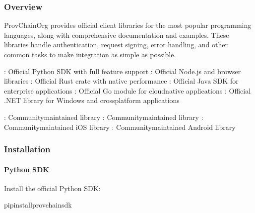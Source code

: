 \documentclass[letterpaper,10pt,english]{sphinxmanual}
\begin{document}
\subsubsection{Overview}
\label{\detokenize{api/client-libraries:overview}}
\sphinxAtStartPar
ProvChainOrg provides official client libraries for the most popular programming languages, along with comprehensive documentation and examples. These libraries handle authentication, request signing, error handling, and other common tasks to make integration as simple as possible.

\sphinxAtStartPar
{}
\sphinxhyphen{} : Official Python SDK with full feature support
\sphinxhyphen{} : Official Node.js and browser libraries
\sphinxhyphen{} : Official Rust crate with native performance
\sphinxhyphen{} : Official Java SDK for enterprise applications
\sphinxhyphen{} : Official Go module for cloud\sphinxhyphen{}native applications
\sphinxhyphen{} : Official .NET library for Windows and cross\sphinxhyphen{}platform applications

\sphinxAtStartPar
{}
\sphinxhyphen{} : Community\sphinxhyphen{}maintained library
\sphinxhyphen{} : Community\sphinxhyphen{}maintained library
\sphinxhyphen{} : Community\sphinxhyphen{}maintained iOS library
\sphinxhyphen{} : Community\sphinxhyphen{}maintained Android library


\subsubsection{Installation}
\label{\detokenize{api/client-libraries:installation}}

\paragraph{Python SDK}
\label{\detokenize{api/client-libraries:python-sdk}}
\sphinxAtStartPar
Install the official Python SDK:

\begin{sphinxVerbatim}[commandchars=\\\{\}]
pipinstallprovchain\PYGZhy{}sdk
\end{sphinxVerbatim}
\end{document}
